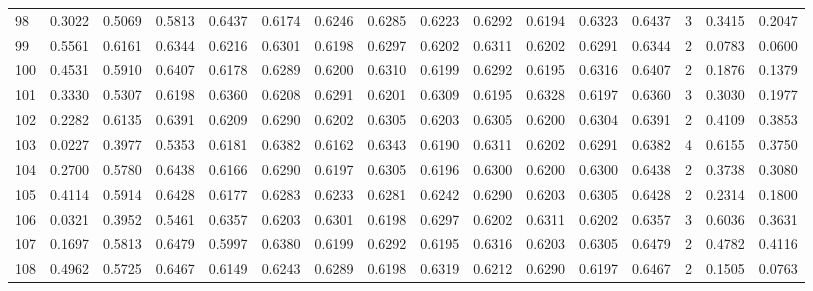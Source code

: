 \begin{tabular}{lrrrrrrrrrrrrrrr}
98  &      0.3022 &  0.5069 &  0.5813 &  0.6437 &  0.6174 &  0.6246 &  0.6285 &  0.6223 &  0.6292 &  0.6194 &   0.6323 &     0.6437 &      3 &                    0.3415 &                     0.2047 \\
99  &      0.5561 &  0.6161 &  0.6344 &  0.6216 &  0.6301 &  0.6198 &  0.6297 &  0.6202 &  0.6311 &  0.6202 &   0.6291 &     0.6344 &      2 &                    0.0783 &                     0.0600 \\
100 &      0.4531 &  0.5910 &  0.6407 &  0.6178 &  0.6289 &  0.6200 &  0.6310 &  0.6199 &  0.6292 &  0.6195 &   0.6316 &     0.6407 &      2 &                    0.1876 &                     0.1379 \\
101 &      0.3330 &  0.5307 &  0.6198 &  0.6360 &  0.6208 &  0.6291 &  0.6201 &  0.6309 &  0.6195 &  0.6328 &   0.6197 &     0.6360 &      3 &                    0.3030 &                     0.1977 \\
102 &      0.2282 &  0.6135 &  0.6391 &  0.6209 &  0.6290 &  0.6202 &  0.6305 &  0.6203 &  0.6305 &  0.6200 &   0.6304 &     0.6391 &      2 &                    0.4109 &                     0.3853 \\
103 &      0.0227 &  0.3977 &  0.5353 &  0.6181 &  0.6382 &  0.6162 &  0.6343 &  0.6190 &  0.6311 &  0.6202 &   0.6291 &     0.6382 &      4 &                    0.6155 &                     0.3750 \\
104 &      0.2700 &  0.5780 &  0.6438 &  0.6166 &  0.6290 &  0.6197 &  0.6305 &  0.6196 &  0.6300 &  0.6200 &   0.6300 &     0.6438 &      2 &                    0.3738 &                     0.3080 \\
105 &      0.4114 &  0.5914 &  0.6428 &  0.6177 &  0.6283 &  0.6233 &  0.6281 &  0.6242 &  0.6290 &  0.6203 &   0.6305 &     0.6428 &      2 &                    0.2314 &                     0.1800 \\
106 &      0.0321 &  0.3952 &  0.5461 &  0.6357 &  0.6203 &  0.6301 &  0.6198 &  0.6297 &  0.6202 &  0.6311 &   0.6202 &     0.6357 &      3 &                    0.6036 &                     0.3631 \\
107 &      0.1697 &  0.5813 &  0.6479 &  0.5997 &  0.6380 &  0.6199 &  0.6292 &  0.6195 &  0.6316 &  0.6203 &   0.6305 &     0.6479 &      2 &                    0.4782 &                     0.4116 \\
108 &      0.4962 &  0.5725 &  0.6467 &  0.6149 &  0.6243 &  0.6289 &  0.6198 &  0.6319 &  0.6212 &  0.6290 &   0.6197 &     0.6467 &      2 &                    0.1505 &                     0.0763 \\

\end{tabular}
